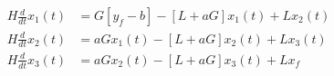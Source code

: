 \begin{equation}
  \begin{aligned}
    H \frac{d}{dt}x_1(t) & = G [y_f - b] - [L + a G] x_1(t) + L x_2(t)
    \\
    H \frac{d}{dt}x_2(t) & = a G x_1(t) - [L + a G]x_2(t) + L x_3(t)
    \\
    H \frac{d}{dt}x_3(t) & = a G x_2(t) - [L + a G]x_3(t) + L x_f
  \end{aligned}
  \label{eq:three_absorber01_3}
\end{equation}